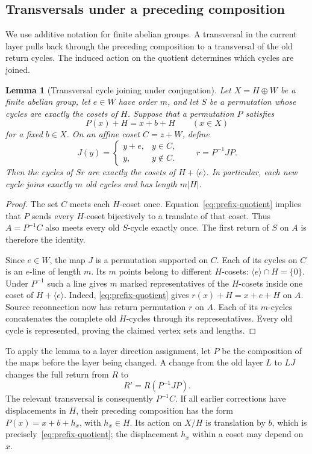 \documentclass[11pt,reqno]{amsart}
\numberwithin{equation}{section}
\newtheorem{lemma}[theorem]{Lemma}
\theoremstyle{definition}
\theoremstyle{remark}
\begin{document}
\subsection{Transversals under a preceding composition}
We use additive notation for finite abelian groups. A transversal in the current
layer pulls back through the preceding composition to a transversal of the old
return cycles. The induced action on the quotient determines which cycles are
joined.

\begin{lemma}[Transversal cycle joining under conjugation]\label{lem:chronological}
Let $X=H\oplus W$ be a finite abelian group, let $e\in W$ have order $m$, and let
$S$ be a permutation whose cycles are exactly the cosets of $H$. Suppose that a
permutation $P$ satisfies
\begin{equation}\label{eq:prefix-quotient}
 P(x)+H=x+b+H\qquad(x\in X)
\end{equation}
for a fixed $b\in X$. On an affine coset $C=z+W$, define
\[
 J(y)=\begin{cases}y+e,&y\in C,\\y,&y\notin C.\end{cases}
 \qquad r=P^{-1}JP.
\]
Then the cycles of $Sr$ are exactly the cosets of $H+\langle e\rangle$.
In particular, each new cycle joins exactly $m$ old cycles and has length $m|H|$.
\end{lemma}
\begin{proof}
The set $C$ meets each $H$-coset once. Equation~\eqref{eq:prefix-quotient} implies
that $P$ sends every $H$-coset bijectively to a translate of that coset. Thus
$A=P^{-1}C$ also meets every old $S$-cycle exactly once. The first return of $S$
on $A$ is therefore the identity.

Since $e\in W$, the map $J$ is a permutation supported on $C$. Each of its cycles
on $C$ is an $e$-line of length $m$. Its $m$ points belong to different $H$-cosets:
$\langle e\rangle\cap H=\{0\}$. Under $P^{-1}$ such a line gives $m$ marked
representatives of the $H$-cosets inside one coset of $H+\langle e\rangle$.
Indeed, \eqref{eq:prefix-quotient} gives $r(x)+H=x+e+H$ on $A$.
Source reconnection now has return permutation $r$ on $A$. Each of its $m$-cycles
concatenates the complete old $H$-cycles through its representatives. Every old cycle is represented, proving the claimed vertex sets and lengths.
\end{proof}

To apply the lemma to a layer direction assignment, let $P$ be the composition of the maps before
the layer being changed. A change from the old layer $L$ to $LJ$ changes the full
return from $R$ to
\begin{equation}\label{eq:chronological-identity}
 R'=R(P^{-1}JP).
\end{equation}
The relevant transversal is consequently $P^{-1}C$. If all earlier corrections
have displacements in $H$, their preceding composition has the form
$P(x)=x+b+h_x$, with $h_x\in H$. Its action on $X/H$ is translation by $b$,
which is precisely~\eqref{eq:prefix-quotient}; the displacement $h_x$ within a
coset may depend on $x$.
\end{document}

